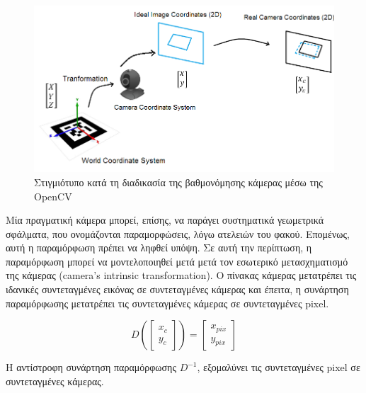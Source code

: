 \begin{figure}[H]
    \centering
    \includegraphics[scale=1.1, angle=0]{Files/Figures/transformation1.png}
    \caption[Στιγμιότυπο κατά τη διαδικασία της βαθμονόμησης κάμερας μέσω της OpenCV]{ Στιγμιότυπο κατά τη διαδικασία της βαθμονόμησης κάμερας μέσω της OpenCV}
    \label{fig:transformation1}
\end{figure}









Mία πραγματική κάμερα μπορεί, επίσης, να παράγει συστηματικά γεωμετρικά σφάλματα, που ονομάζονται παραμορφώσεις, λόγω ατελειών του φακού. 
Επομένως, αυτή η παραμόρφωση πρέπει να ληφθεί υπόψη.
Σε αυτή την περίπτωση, η παραμόρφωση μπορεί να μοντελοποιηθεί μετά μετά τον εσωτερικό μετασχηματισμό της κάμερας (camera’s intrinsic transformation). Ο πίνακας κάμερας μετατρέπει τις ιδανικές συντεταγμένες εικόνας σε συντεταγμένες κάμερας και έπειτα, η συνάρτηση παραμόρφωσης μετατρέπει τις συντεταγμένες κάμερας σε συντεταγμένες pixel.

\begin{equation}
D
\left(
\begin{bmatrix}
x_{c}\\
y_{c}   
\end{bmatrix}
\right )
=
\begin{bmatrix}
x_{pix}\\
y_{pix}   
\end{bmatrix}
\end{equation} 



Η αντίστροφη συνάρτηση παραμόρφωσης $D^{-1}$, εξομαλύνει τις συντεταγμένες pixel σε συντεταγμένες κάμερας.

